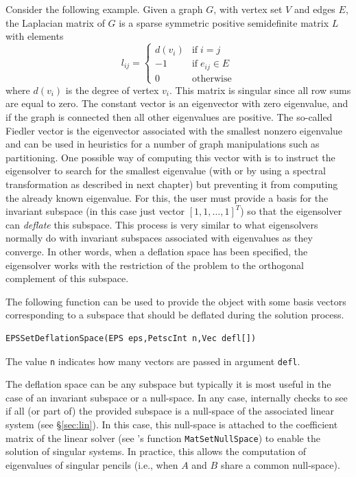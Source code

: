 	Consider the following example. Given a graph $G$, with vertex set $V$ and edges $E$, the Laplacian matrix of $G$ is a sparse symmetric positive semidefinite matrix $L$ with elements
$$l_{ij}=\left\{\begin{array}{cl}
         d(v_i) & \mathrm{if}\;i=j\\
         -1 & \mathrm{if}\;e_{ij}\in E\\
         0&\mathrm{otherwise}
\end{array}\right.$$
where $d(v_i)$ is the degree of vertex $v_i$. This matrix is singular since all row sums are equal to zero. The constant vector is an eigenvector with zero eigenvalue, and if the graph is connected then all other eigenvalues are positive. The so-called Fiedler vector is the eigenvector associated with the smallest nonzero eigenvalue and can be used in heuristics for a number of graph manipulations such as partitioning. One possible way of computing this vector with \slepc is to instruct the eigensolver to search for the smallest eigenvalue (with  or by using a spectral transformation as described in next chapter) but preventing it from computing the already known eigenvalue. For this, the user must provide a basis for the invariant subspace (in this case just vector $[1,1,\ldots,1]^T$) so that the eigensolver can \emph{deflate} this subspace. This process is very similar to what eigensolvers normally do with invariant subspaces associated with eigenvalues as they converge. In other words, when a deflation space has been specified, the eigensolver works with the restriction of the problem to the orthogonal complement of this subspace.

	The following function can be used to provide the  object with some basis vectors corresponding to a subspace that should be deflated during the solution process.
	\begin{Verbatim}[fontsize=\small]
	EPSSetDeflationSpace(EPS eps,PetscInt n,Vec defl[])
	\end{Verbatim}
The value \texttt{n} indicates how many vectors are passed in argument \texttt{defl}.

	The deflation space can be any subspace but typically it is most useful in the case of an invariant subspace or a null-space. In any case, \slepc internally checks to see if all (or part of) the provided subspace is a null-space of the associated linear system (see \S\ref{sec:lin}). In this case, this null-space is attached to the coefficient matrix of the linear solver (see \petsc's function \texttt{MatSetNullSpace}) to enable the solution of singular systems. In practice, this allows the computation of eigenvalues of singular pencils (i.e., when $A$ and $B$ share a common null-space).

